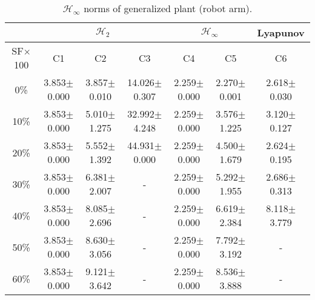 \begin{table}[H]
\centering
\scriptsize
\begin{tabular}{| c || c | c | c | c | c | c |}
	\hline
	 & \multicolumn{3}{c|}{$\mathcal{H}_{2}$} & \multicolumn{2}{c|}{$\mathcal{H}_{\infty}$} & Lyapunov\\
	\hline
	SF$\times$100 & C1& C2 & C3 & C4 & C5 & C6\\
	\hline\hline
	0\% & 3.853$\pm$0.000 & 3.857$\pm$0.010 & 14.026$\pm$0.307 & 2.259$\pm$0.000 & 2.270$\pm$0.001 & 2.618$\pm$0.030\\
	\hline
	10\% & 3.853$\pm$0.000 & 5.010$\pm$1.275 & 32.992$\pm$4.248 & 2.259$\pm$0.000 & 3.576$\pm$1.225 & 3.120$\pm$0.127\\
	\hline
	20\% & 3.853$\pm$0.000 & 5.552$\pm$1.392 & 44.931$\pm$0.000 & 2.259$\pm$0.000 & 4.500$\pm$1.679 & 2.624$\pm$0.195\\
	\hline
	30\% & 3.853$\pm$0.000 & 6.381$\pm$2.007 & - & 2.259$\pm$0.000 & 5.292$\pm$1.955 & 2.686$\pm$0.313\\
	\hline
	40\% & 3.853$\pm$0.000 & 8.085$\pm$2.696 & - & 2.259$\pm$0.000 & 6.619$\pm$2.384 & 8.118$\pm$3.779\\
	\hline
	50\% & 3.853$\pm$0.000 & 8.630$\pm$3.056 & - & 2.259$\pm$0.000 & 7.792$\pm$3.192 & -\\
	\hline
	60\% & 3.853$\pm$0.000 & 9.121$\pm$3.642 & - & 2.259$\pm$0.000 & 8.536$\pm$3.888 & -\\
	\hline
\end{tabular}
\caption{$\mathcal{H}_{\infty}$ norms of generalized plant (robot arm).}
\label{table:hinfinity_norms_robot_arm:noise}
\end{table}

